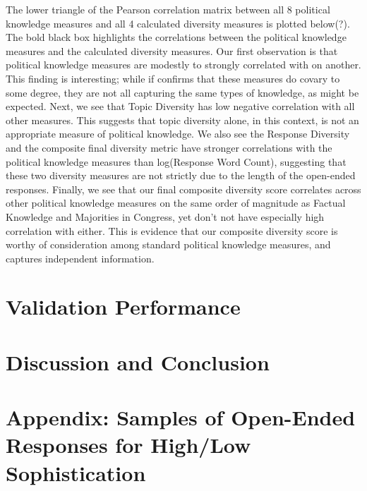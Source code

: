 \documentclass[12pt]{article}
\begin{document}
The lower triangle of the Pearson correlation matrix between all 8 political knowledge measures and all 4 calculated diversity measures is plotted below(?).  The bold black box highlights the correlations between the political knowledge measures and the calculated diversity measures.  Our first observation is that political knowledge measures are modestly to strongly correlated with on another.  This finding is interesting; while if confirms that these measures do covary to some degree, they are not all capturing the same types of knowledge, as might be expected.  Next, we see that Topic Diversity has low negative correlation with all other measures.  This suggests that topic diversity alone, in this context, is not an appropriate measure of political knowledge.  We also see the Response Diversity and the composite final diversity metric have stronger correlations with the political knowledge measures than log(Response Word Count), suggesting that these two diversity measures are not strictly due to the length of the open-ended responses.  Finally, we see that our final composite diversity score correlates across other political knowledge measures on the same order of magnitude as Factual Knowledge and Majorities in Congress, yet don’t not have especially high correlation with either.  This is evidence that our composite diversity score is worthy of consideration among standard political knowledge measures, and captures independent information.    

\section{Validation Performance}


\section{Discussion and Conclusion}


\clearpage\singlespacing\footnotesize



\clearpage
\section*{Appendix: Samples of Open-Ended Responses for High/Low Sophistication}
\end{document}
